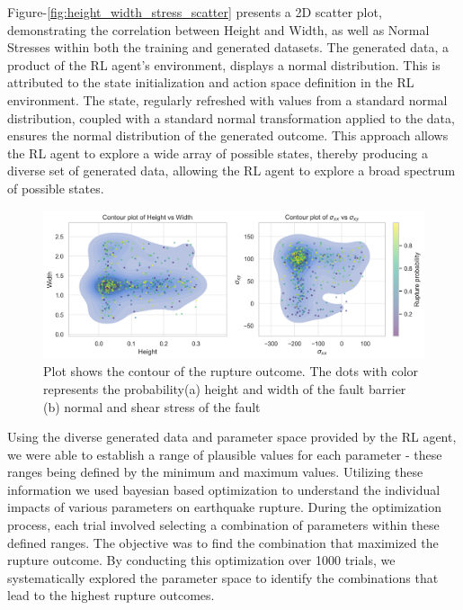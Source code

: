 \documentclass{article}
\begin{document}
Figure-\ref{fig:height_width_stress_scatter} presents a 2D scatter plot, demonstrating the correlation between Height and Width, as well as Normal Stresses within both the training and generated datasets. The generated data, a product of the RL agent's environment, displays a normal distribution. This is attributed to the state initialization and action space definition in the RL environment. The state, regularly refreshed with values from a standard normal distribution, coupled with a standard normal transformation applied to the data, ensures the normal distribution of the generated outcome. This approach allows the RL agent to explore a wide array of possible states, thereby producing a diverse set of generated data, allowing the RL agent to explore a broad spectrum of possible states.

\begin{figure}[!h]
    \begin{center}
        \includegraphics[scale=0.50]{figures/contour.png}
    \end{center}
    \caption{Plot shows the contour of the rupture outcome. The dots with color represents the probability(a) height and width of the fault barrier (b) normal and shear stress of the fault}
    \label{fig:contour}
\end{figure}


Using the diverse generated data and parameter space provided by the RL agent, we were able to establish a range of plausible values for each parameter - these ranges being defined by the minimum and maximum values. Utilizing these information we used bayesian based optimization to understand the individual impacts of various parameters on earthquake rupture. During the optimization process, each trial involved selecting a combination of parameters within these defined ranges. The objective was to find the combination that maximized the rupture outcome. By conducting this optimization over 1000 trials, we systematically explored the parameter space to identify the combinations that lead to the highest rupture outcomes.
\end{document}
